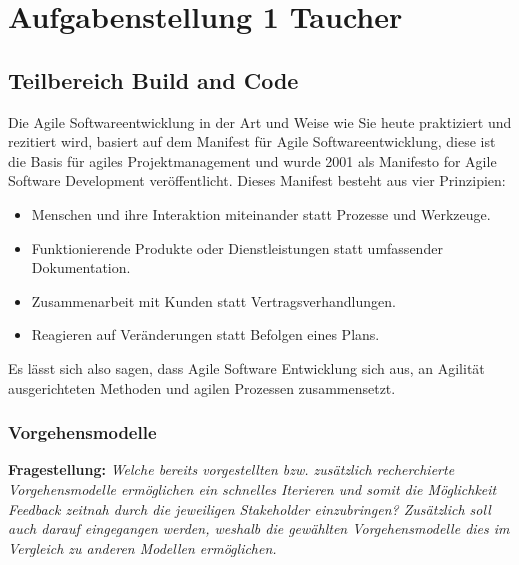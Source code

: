 \newpage
\section{Aufgabenstellung 1 Taucher}

                      


\subsection{Teilbereich Build and Code}
Die Agile Softwareentwicklung in der Art und Weise wie Sie heute praktiziert und rezitiert wird, basiert auf 
dem Manifest für Agile Softwareentwicklung, diese ist die Basis für agiles Projektmanagement und wurde
2001 als Manifesto for Agile Software Development veröffentlicht. Dieses Manifest besteht aus vier Prinzipien:
\begin{itemize}
    \item Menschen und ihre Interaktion miteinander statt Prozesse und Werkzeuge.
    \item Funktionierende Produkte oder Dienstleistungen statt umfassender Dokumentation.
    \item Zusammenarbeit mit Kunden statt Vertragsverhandlungen.
    \item Reagieren auf Veränderungen statt Befolgen eines Plans. \cite{agile-manifesto}
\end{itemize}

Es lässt sich also sagen, dass Agile Software Entwicklung sich aus, an Agilität ausgerichteten 
Methoden und agilen Prozessen zusammensetzt. 

\subsubsection{Vorgehensmodelle}
\textbf{Fragestellung:} \textit{Welche bereits vorgestellten bzw. zusätzlich recherchierte Vorgehensmodelle ermöglichen ein
schnelles Iterieren und somit die Möglichkeit Feedback zeitnah durch die jeweiligen Stakeholder
einzubringen? Zusätzlich soll auch darauf eingegangen werden, weshalb die gewählten
Vorgehensmodelle dies im Vergleich zu anderen Modellen ermöglichen.}
\\

